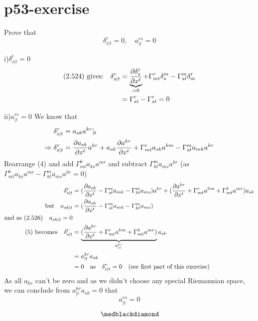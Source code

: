 \section{p53-exercise}
\begin{tcolorbox}
Prove that $$\delta^r_{s|t} = 0, \quad a^{rs}_{|t} = 0$$
\end{tcolorbox}

i)$\delta^t_{s|t} = 0$
\begin{align}
\text{(2.524) gives:}\quad \delta^r_{s|t} &= \underbrace{\pdv{\delta^r_{s}}{x^t}}_\text{=0} + \Gamma^r_{mt}\delta^m_{s}- \Gamma^m_{st}\delta^r_{m}\\
&= \Gamma^r_{st}- \Gamma^r_{st} = 0
\end{align}

ii)$ a^{rs}_{|t} = 0$
We know that 
\begin{align}
\delta^r_{s|t} &= a_{sk}a^{kr}|_{t}\\
\Rightarrow \delta^r_{s|t} &= \pdv{a_{sk}}{x^t}a^{kr}+ a_{sk}\pdv{a^{kr} }{x^t} + \Gamma^r_{mt}a_{sk}a^{km}- \Gamma^m_{st}a_{mk}a^{kr}
\end{align}
Rearrange (4) and add $\Gamma^k_{mt}a_{ks}a^{mr}$ and subtract $\Gamma^m_{kt}a_{ms}a^{kr}$ (as $\Gamma^k_{mt}a_{ks}a^{mr} - \Gamma^m_{kt}a_{ms}a^{kr}  =0 $)
\begin{align}
\delta^r_{s|t} &= (\pdv{a_{sk}}{x^t}- \Gamma^m_{st}a_{mk}-\Gamma^m_{kt}a_{ms} )a^{kr}+ (\pdv{a^{kr} }{x^t} + \Gamma^r_{mt}a^{km}+ \Gamma^k_{mt}a^{mr})a_{sk}\\
\text{but} \quad  a_{sk|t} &= (\pdv{a_{sk}}{x^t}- \Gamma^m_{st}a_{mk}-\Gamma^m_{kt}a_{ms})\\
\text{and as (2.526)}\quad a_{sk|t} = 0\\
\text{(5) becomes}\quad \delta^r_{s|t} &= \underbrace{(\pdv{a^{kr} }{x^t} + \Gamma^r_{mt}a^{km}+ \Gamma^k_{mt}a^{mr})}_{\begin{huge}a^{kr}_{|t}\end{huge}}a_{sk}\\
\ &= a^{kr}_{|t}a_{sk}\\
\ &= 0 \quad \text{as}\quad \delta^r_{s|t}=0  \quad \text{(see first  part of this exercise)}
\end{align}
As all $a_{ks}$ can't be zero and as we didn't choose any special Riemannian space, we can conclude from $ a^{kr}_{|t}a_{sk} = 0$ that $$ a^{rs}_{|t} = 0$$ 
$$\medblackdiamond$$
\newpage

